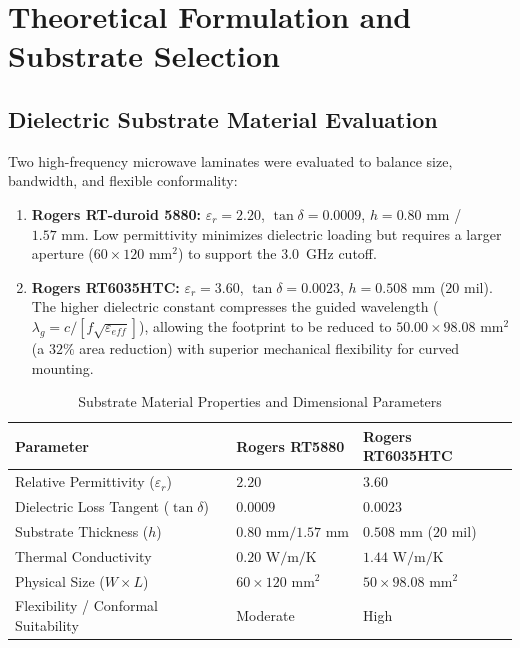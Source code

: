 \documentclass[journal,compsoc,twocolumn,10pt]{IEEEtran}
\begin{document}
\section{Theoretical Formulation and Substrate Selection}

\subsection{Dielectric Substrate Material Evaluation}
Two high-frequency microwave laminates were evaluated to balance size, bandwidth, and flexible conformality:
\begin{enumerate}
    \item \textbf{Rogers RT-duroid 5880:} $\varepsilon_r = 2.20$, $\tan\delta = 0.0009$, $h = 0.80\text{ mm}$ / $1.57\text{ mm}$. Low permittivity minimizes dielectric loading but requires a larger aperture ($60 \times 120\text{ mm}^2$) to support the 3.0~GHz cutoff.
    \item \textbf{Rogers RT6035HTC:} $\varepsilon_r = 3.60$, $\tan\delta = 0.0023$, $h = 0.508\text{ mm}$ ($20\text{ mil}$). The higher dielectric constant compresses the guided wavelength ($\lambda_g = c / [f\sqrt{\varepsilon_{eff}}]$), allowing the footprint to be reduced to $50.00 \times 98.08\text{ mm}^2$ (a $32\%$ area reduction) with superior mechanical flexibility for curved mounting.
\end{enumerate}

\begin{table}[htbp]
\caption{Substrate Material Properties and Dimensional Parameters}
\label{tab:substrates}
\centering
\begin{tabular}{@{}lll@{}}
\toprule
\textbf{Parameter} & \textbf{Rogers RT5880} & \textbf{Rogers RT6035HTC} \\ \midrule
Relative Permittivity ($\varepsilon_r$) & $2.20$ & $3.60$ \\
Dielectric Loss Tangent ($\tan\delta$) & $0.0009$ & $0.0023$ \\
Substrate Thickness ($h$) & $0.80\text{ mm} / 1.57\text{ mm}$ & $0.508\text{ mm}$ ($20\text{ mil}$) \\
Thermal Conductivity & $0.20\text{ W/m/K}$ & $1.44\text{ W/m/K}$ \\
Physical Size ($W \times L$) & $60 \times 120\text{ mm}^2$ & $50 \times 98.08\text{ mm}^2$ \\
Flexibility / Conformal Suitability & Moderate & High \\ \bottomrule
\end{tabular}
\end{table}
\end{document}
